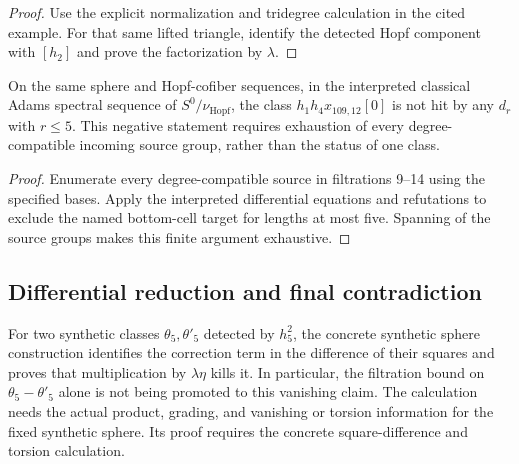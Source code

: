\begin{proof}
  Use the explicit normalization and tridegree calculation in the cited
  example. For that same lifted triangle, identify the detected Hopf
  component with $[h_2]$ and prove the factorization by $\lambda$.
\end{proof}

\begin{proposition}
  \label{evidence:cnu126-short-incoming-exclusion}
  \notready
  On the same sphere and Hopf-cofiber sequences, in the
  interpreted classical Adams spectral sequence of
  $S^0/\nu_{\mathrm{Hopf}}$, the class
  $h_1h_4x_{109,12}[0]$ is not hit by any $d_r$ with $r\le5$.  This negative
  statement requires exhaustion of every degree-compatible incoming
  source group, rather than the status of one class.
\end{proposition}

\begin{proof}
  Enumerate every degree-compatible source in filtrations 9--14 using
  the specified bases. Apply the interpreted differential equations and
  refutations to exclude the named bottom-cell target for lengths at most
  five. Spanning of the source groups makes this finite argument exhaustive.
\end{proof}

\subsection{Differential reduction and final contradiction}

\begin{proposition}
  \label{prop:theta5-choice-correction-vanishes}
  \notready
  For two synthetic classes $\theta_5,\theta'_5$ detected by $h_5^2$, the
  concrete synthetic sphere construction identifies the correction term in
  the difference of their squares and proves that multiplication by
  $\lambda\eta$ kills it.  In particular, the filtration bound on
  $\theta_5-\theta'_5$ alone is not being promoted to this vanishing claim.
  The calculation needs the actual product, grading, and vanishing or torsion
  information for the fixed synthetic sphere.  Its proof requires the concrete square-difference and torsion calculation.
\end{proposition}

